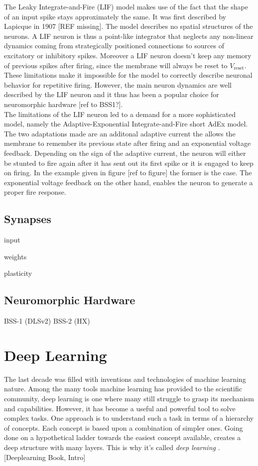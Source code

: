 The Leaky Integrate-and-Fire (LIF) model makes use of the fact that the shape of an input spike stays approximately the same. It was first described by Lapicque in 1907 [REF missing]. The model describes no spatial structures of the neurons. A LIF neuron is thus a point-like integrator that neglects any non-linear dynamics coming from strategically positioned connections to sources of excitatory or inhibitory spikes. Moreover a LIF neuron doesn't keep any memory of previous spikes after firing, since the membrane will always be reset to $V_{\text{reset}}$. These limitations make it impossible for the model to correctly describe neuronal behavior for repetitive firing. However, the main neuron dynamics are well described by the LIF neuron and it thus has been a popular choice for neuromorphic hardware [ref to BSS1?].\\

The limitations of the LIF neuron led to a demand for a more sophisticated model, namely the Adaptive-Exponential Integrate-and-Fire short AdEx model. The two adaptations made are an additonal adaptive current the allows the membrane to remember its previous state after firing and an exponential voltage feedback. Depending on the sign of the adaptive current, the neuron will either be stunted to fire again after it has sent out its first spike or it is engaged to keep on firing. In the example given in figure [ref to figure] the former is the case. The exponential voltage feedback on the other hand, enables the neuron to generate a proper fire response.\\

\subsection{Synapses}
input

weights

plasticity



\subsection{Neuromorphic Hardware}

BSS-1 (DLSv2)
BSS-2 (HX)



\section{Deep Learning}
\label{deeplearning}
The last decade was filled with inventions and technologies of machine learning nature. Among the many tools machine learning has provided to the scientific community, deep learning is one where many still struggle to grasp its mechanism and capabilities. However, it has become a useful and powerful tool to solve complex tasks. One approach is to understand such a task in terms of a hierarchy of concepts. Each concept is based upon a combination of simpler ones. Going done on a hypothetical ladder towards the easiest concept available, creates a deep structure with many layers. This is why it's called \textit{deep learning} . [Deeplearning Book, Intro]

